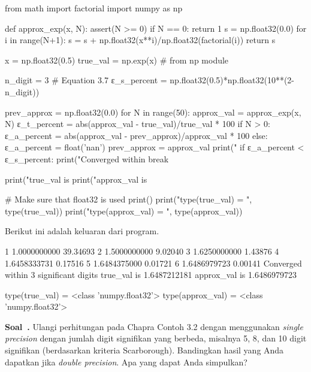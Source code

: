 \documentclass[a4paper,11pt,bahasa]{article} %
\newcounter{soal}%
\newenvironment{soal}[1][]{\refstepcounter{soal}\par\medskip
   \noindent \textbf{Soal~\thesoal. #1} \sffamily}{\medskip}
\begin{document}
\begin{pythoncode}
from math import factorial
import numpy as np
  
def approx_exp(x, N):
  assert(N >= 0)
  if N == 0:
      return 1
  s = np.float32(0.0)
  for i in range(N+1):
      s = s + np.float32(x**i)/np.float32(factorial(i))
  return s
  
x = np.float32(0.5)
true_val = np.exp(x) # from np module
  
n_digit = 3
# Equation 3.7
ε_s_percent = np.float32(0.5)*np.float32(10**(2-n_digit))
  
prev_approx = np.float32(0.0)
for N in range(50):
  approx_val = approx_exp(x, N)
  ε_t_percent = abs(approx_val - true_val)/true_val * 100
  if N > 0:
    ε_a_percent = abs(approx_val - prev_approx)/approx_val * 100
  else:
    ε_a_percent = float('nan')
  prev_approx = approx_val
  print("%
  if ε_a_percent < ε_s_percent:
    print("Converged within %
    break
  
print("true_val   is %
print("approx_val is %
  
# Make sure that float32 is used
print()
print("type(true_val)   = ", type(true_val))
print("type(approx_val) = ", type(approx_val))
\end{pythoncode}

Berikut ini adalah keluaran dari program.
\begin{textcode}
  1       1.0000000000   39.34693%
  2       1.5000000000    9.02040%
  3       1.6250000000    1.43876%
  4       1.6458333731    0.17516%
  5       1.6484375000    0.01721%
  6       1.6486979723    0.00141%
Converged within 3 significant digits
true_val   is       1.6487212181
approx_val is       1.6486979723

type(true_val)   =  <class 'numpy.float32'>
type(approx_val) =  <class 'numpy.float32'>
\end{textcode}

\begin{soal}
Ulangi perhitungan pada Chapra Contoh 3.2 dengan menggunakan \textit{single precision}
dengan jumlah digit signifikan yang berbeda, misalnya 5, 8, dan 10 digit signifikan
(berdasarkan kriteria Scarborough). Bandingkan hasil yang Anda dapatkan jika
\textit{double precision}. Apa yang dapat Anda simpulkan?
\end{soal}
\end{document}
